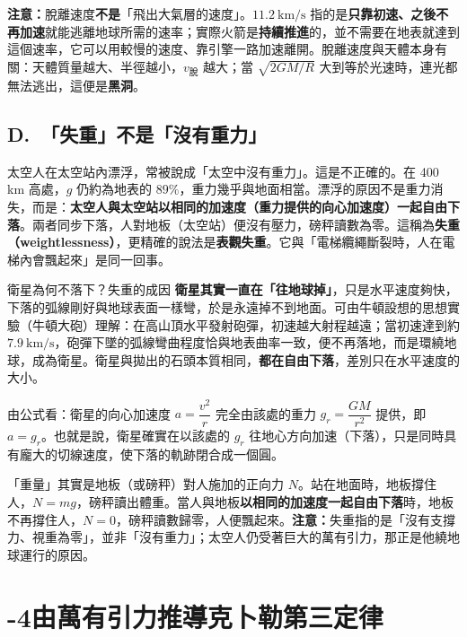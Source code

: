 \documentclass[11pt]{article}
\begin{document}
\textbf{注意：}脫離速度\textbf{不是}「飛出大氣層的速度」。$11.2\ \text{km/s}$ 指的是\textbf{只靠初速、之後不再加速}就能逃離地球所需的速率；實際火箭是\textbf{持續推進}的，並不需要在地表就達到這個速率，它可以用較慢的速度、靠引擎一路加速離開。脫離速度與天體本身有關：天體質量越大、半徑越小，$v_{\text{脫}}$ 越大；當 $\sqrt{2GM/R}$ 大到等於光速時，連光都無法逃出，這便是\textbf{黑洞}。

\subsection*{\sffamily D.\ 「失重」不是「沒有重力」}

太空人在太空站內漂浮，常被說成「太空中沒有重力」。這是不正確的。在 400 km 高處，$g$ 仍約為地表的 $89\%$，重力幾乎與地面相當。漂浮的原因不是重力消失，而是：\textbf{太空人與太空站以相同的加速度（重力提供的向心加速度）一起自由下落}。兩者同步下落，人對地板（太空站）便沒有壓力，磅秤讀數為零。這稱為\textbf{失重（weightlessness）}，更精確的說法是\textbf{表觀失重}。它與「電梯纜繩斷裂時，人在電梯內會飄起來」是同一回事。

\begin{補充框}{衛星為何不落下？失重的成因}
\textbf{衛星其實一直在「往地球掉」}，只是水平速度夠快，下落的弧線剛好與地球表面一樣彎，於是永遠掉不到地面。可由牛頓設想的思想實驗（牛頓大砲）理解：在高山頂水平發射砲彈，初速越大射程越遠；當初速達到約 $7.9\ \text{km/s}$，砲彈下墜的弧線彎曲程度恰與地表曲率一致，便不再落地，而是環繞地球，成為衛星。衛星與拋出的石頭本質相同，\textbf{都在自由下落}，差別只在水平速度的大小。


由公式看：衛星的向心加速度 $a=\dfrac{v^2}{r}$ 完全由該處的重力 $g_r=\dfrac{GM}{r^2}$ 提供，即 $a=g_r$。也就是說，衛星確實在以該處的 $g_r$ 往地心方向加速（下落），只是同時具有龐大的切線速度，使下落的軌跡閉合成一個圓。

「重量」其實是地板（或磅秤）對人施加的正向力 $N$。站在地面時，地板撐住人，$N=mg$，磅秤讀出體重。當人與地板\textbf{以相同的加速度一起自由下落}時，地板不再撐住人，$N=0$，磅秤讀數歸零，人便飄起來。\textbf{注意：}失重指的是「沒有支撐力、視重為零」，並非「沒有重力」；太空人仍受著巨大的萬有引力，那正是他繞地球運行的原因。
\end{補充框}

\section*{-4\quad 由萬有引力推導克卜勒第三定律}
\end{document}
